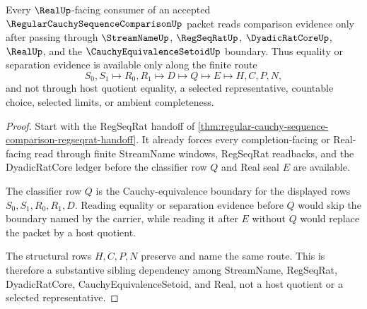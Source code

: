 \begin{theorem}
\label{thm:regular-cauchy-sequence-comparison-real-seal-route}
Every $\RealUp$-facing consumer of an accepted $\RegularCauchySequenceComparisonUp$ packet reads comparison evidence only after passing through $\StreamNameUp$, $\RegSeqRatUp$, $\DyadicRatCoreUp$, $\RealUp$, and the $\CauchyEquivalenceSetoidUp$ boundary. Thus equality or separation evidence is available only along the finite route
$$
S_0,S_1 \longmapsto R_0,R_1 \longmapsto D \longmapsto Q \longmapsto E \longmapsto H,C,P,N,
$$
and not through host quotient equality, a selected representative, countable choice, selected limits, or ambient completeness.
\end{theorem}
\begin{proof}
Start with the RegSeqRat handoff of \autoref{thm:regular-cauchy-sequence-comparison-regseqrat-handoff}. It already forces every completion-facing or Real-facing read through finite StreamName windows, RegSeqRat readbacks, and the DyadicRatCore ledger before the classifier row $Q$ and Real seal $E$ are available.

The classifier row $Q$ is the Cauchy-equivalence boundary for the displayed rows $S_0,S_1,R_0,R_1,D$. Reading equality or separation evidence before $Q$ would skip the boundary named by the carrier, while reading it after $E$ without $Q$ would replace the packet by a host quotient.

The structural rows $H,C,P,N$ preserve and name the same route. This is therefore a substantive sibling dependency among StreamName, RegSeqRat, DyadicRatCore, CauchyEquivalenceSetoid, and Real, not a host quotient or a selected representative.
\end{proof}


